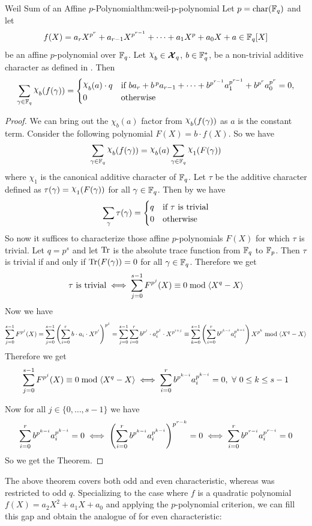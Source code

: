 \begin{Theorem}{Weil Sum of an Affine $p$-Polynomial}{thm:weil-p-polynomial}
  Let $p=\operatorname{char}(\mathbb{F}_q)$ and let
  $$f(X)=a_rX^{p^r}+a_{r-1}X^{p^{r-1}}+\cdots+a_1X^p+a_0X+a\in\mathbb{F}_q[X]$$
  be an affine $p$-polynomial over $\mathbb{F}_q$. Let $\chi_b\in\Xq$, $b\in\mathbb{F}_q^*$, be a non-trivial additive character as defined in \AddCharDefthm. Then
  $$\sum_{\gm\in\bbF_q}\chi_b(f(\gm))=\begin{cases}
    \chi_b(a)\cdot q & \text{if }ba_r+b^{\,p}a_{r-1}+\cdots+b^{p^{r-1}}a_1^{p^{r-1}}+b^{p^r}a_0^{p^r}=0,\\
    0 & \text{otherwise}
  \end{cases}$$
\end{Theorem}
\begin{proof}
  We can bring out the $\chi_b(a)$ factor from $\chi_b(f(\gm))$ as $a$ is the constant term. Consider the following polynomial $F(X)=b\cdot f(X)$. So we have $$\sum_{\gm\in\bbF_q}\chi_b(f(\gm))=\chi_b(a)\sum_{\gm\in\bbF_q}\chi_1(F(\gm))$$where $\chi_1$ is the canonical additive character of $\mathbb{F}_q$. Let $\tau$ be the additive character defined as $\tau(\gm)=\chi_1(F(\gm))$ for all $\gamma\in\mathbb{F}_q$. Then by \AddCharPropsthm[(i)] we have $$\sum_{\gamma}\tau(\gamma)=\begin{cases}
    q & \text{if $\tau$ is trivial}\\ 0 & \text{otherwise}
  \end{cases}$$So now it suffices to characterize those affine $p$-polynomials $F(X)$ for which $\tau$ is trivial. Let $q=p^s$ and let $\operatorname{Tr}$ is the absolute trace function from $\mathbb{F}_q$ to $\mathbb{F}_p$. Then $\tau$ is trivial if and only if $\operatorname{Tr}(F(\gamma))=0$ for all $\gamma\in\mathbb{F}_q$. Therefore we get $$\tau\text{ is trivial}\iff \sum_{j=0}^{s-1}F^{p^j}(X)\equiv 0\bmod{\left\langle X^q-X\right\rangle}$$ Now we have $$\sum_{j=0}^{s-1}F^{p^j}(X)=\sum_{j=0}^{s-1}\left(\sum_{i=0}^{r}b\cdot a_i\cdot X^{p^i}\right)^{p^j}=\sum_{j=0}^{s-1}\sum_{i=0}^{r}b^{p^j}\cdot a_i^{p^j}\cdot X^{p^{i+j}}\equiv \sum_{k=0}^{s-1}\left(\sum_{i=0}^rb^{p^{k-i}}a_i^{p^{k-i}}\right)X^{p^k}\bmod{\left\langle X^q-X\right\rangle}$$Therefore we get $$\sum_{j=0}^{s-1}F^{p^j}(X)\equiv 0\bmod{\left\langle X^q-X\right\rangle}\iff \sum_{i=0}^rb^{p^{k-i}}a_i^{p^{k-i}}=0,\ \forall\ 0\leq k\leq s-1$$

  Now for all $j\in\{0,\dots, s-1\}$ we have $$\sum_{i=0}^rb^{p^{k-i}}a_i^{p^{k-i}}=0\iff \left(\sum_{i=0}^rb^{p^{k-i}}a_i^{p^{k-i}}\right)^{p^{r-k}}=0\iff \sum_{i=0}^rb^{p^{r-i}}a_i^{p^{r-i}}=0$$So we get the Theorem. 
\end{proof}
The above theorem covers both odd and even characteristic, whereas  was restricted to odd $q$. Specializing to the case where $f$ is a quadratic polynomial $f(X)=a_2X^2+a_1X+a_0$ and applying the $p$-polynomial criterion, we can fill this gap and obtain the analogue of  for even characteristic: \newpage
